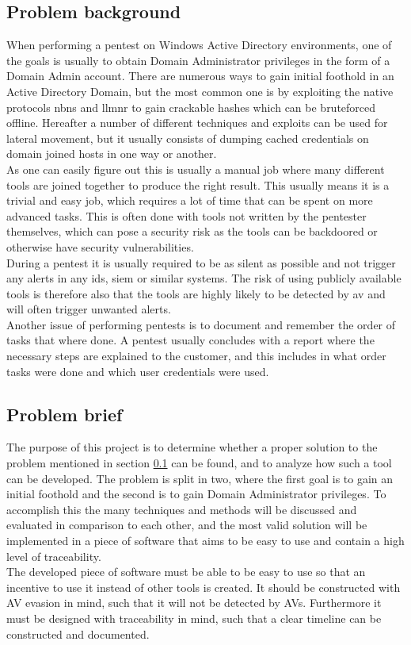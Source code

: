 \documentclass{article}
\begin{document}
\subsection{Problem background}
\label{sec:problem-background}
When performing a pentest on Windows Active Directory environments, one of the goals is usually to obtain Domain Administrator privileges in the form of a Domain Admin account. There are numerous ways to gain initial foothold in an Active Directory Domain, but the most common one is by exploiting the native protocols \gls{nbns} and \gls{llmnr}\cite{url:zero-to-domain-admin} to gain crackable hashes which can be bruteforced offline.
Hereafter a number of different techniques and exploits can be used for lateral movement, but it usually consists of dumping cached credentials on domain joined hosts in one way or another.
\\
As one can easily figure out this is usually a manual job where many different tools are joined together to produce the right result. This usually means it is a trivial and easy job, which requires a lot of time that can be spent on more advanced tasks. This is often done with tools not written by the pentester themselves, which can pose a security risk as the tools can be backdoored or otherwise have security vulnerabilities.
\\
During a pentest it is usually required to be as silent as possible and not trigger any alerts in any \gls{ids}, \gls{siem} or similar systems. The risk of using publicly available tools is therefore also that the tools are highly likely to be detected by \gls{av} and will often trigger unwanted alerts.
\\
Another issue of performing pentests is to document and remember the order of tasks that where done. A pentest usually concludes with a report where the necessary steps are explained to the customer, and this includes in what order tasks were done and which user credentials were used.

\subsection{Problem brief}
The purpose of this project is to determine whether a proper solution to the problem mentioned in section \ref{sec:problem-background} can be found, and to analyze how such a tool can be developed. The problem is split in two, where the first goal is to gain an initial foothold and the second is to gain Domain Administrator privileges. To accomplish this the many techniques and methods will be discussed and evaluated in comparison to each other, and the most valid solution will be implemented in a piece of software that aims to be easy to use and contain a high level of traceability.
\\
The developed piece of software must be able to be easy to use so that an incentive to use it instead of other tools is created. It should be constructed with AV evasion in mind, such that it will not be detected by AVs. Furthermore it must be designed with traceability in mind, such that a clear timeline can be constructed and documented.
\end{document}
